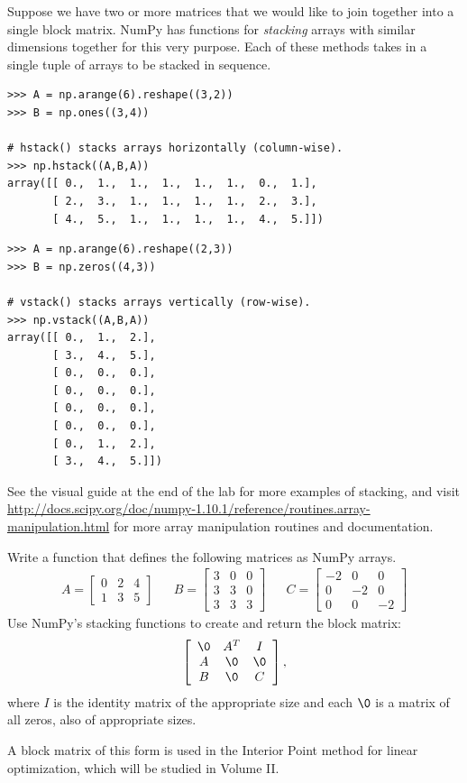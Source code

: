 Suppose we have two or more matrices that we would like to join together into a single block matrix.
NumPy has functions for \emph{stacking} arrays with similar dimensions together for this very purpose.
Each of these methods takes in a single tuple of arrays to be stacked in sequence.

\begin{lstlisting}
>>> A = np.arange(6).reshape((3,2))
>>> B = np.ones((3,4))

# hstack() stacks arrays horizontally (column-wise).
>>> np.hstack((A,B,A))
array([[ 0.,  1.,  1.,  1.,  1.,  1.,  0.,  1.],
       [ 2.,  3.,  1.,  1.,  1.,  1.,  2.,  3.],
       [ 4.,  5.,  1.,  1.,  1.,  1.,  4.,  5.]])
\end{lstlisting}

\begin{lstlisting}
>>> A = np.arange(6).reshape((2,3))
>>> B = np.zeros((4,3))

# vstack() stacks arrays vertically (row-wise).
>>> np.vstack((A,B,A))
array([[ 0.,  1.,  2.],
       [ 3.,  4.,  5.],
       [ 0.,  0.,  0.],
       [ 0.,  0.,  0.],
       [ 0.,  0.,  0.],
       [ 0.,  0.,  0.],
       [ 0.,  1.,  2.],
       [ 3.,  4.,  5.]])
\end{lstlisting}

See the visual guide at the end of the lab for more examples of stacking, and 
visit \url{http://docs.scipy.org/doc/numpy-1.10.1/reference/routines.array-manipulation.html} for more array manipulation routines and documentation.

\begin{problem} %
Write a function that defines the following matrices as NumPy arrays.
\begin{align*}
A = \left[\begin{array}{rrr}
0 & 2 & 4\\ 
1 & 3 & 5\end{array}\right]
&&
B = \left[\begin{array}{rrr}
3 & 0 & 0\\ 
3 & 3 & 0\\
3 & 3 & 3\end{array}\right]
&&
C = \left[\begin{array}{rrr}
-2 & 0 & 0\\ 
0 & -2 & 0\\
0 & 0 & -2\end{array}\right]
\end{align*}
Use NumPy's stacking functions to create and return the block matrix:
\begin{align*}
\left[\begin{array}{ccc}
\0 & A^T & I\\ 
A & \0 & \0 \\
B & \0 & C \end{array}\right],
\end{align*}
where $I$ is the identity matrix of the appropriate size and each $\0$ is a matrix of all zeros, also of appropriate sizes.

A block matrix of this form is used in the Interior Point method for linear optimization, which will be studied in Volume II.
\label{prob:simple3}
\end{problem}

